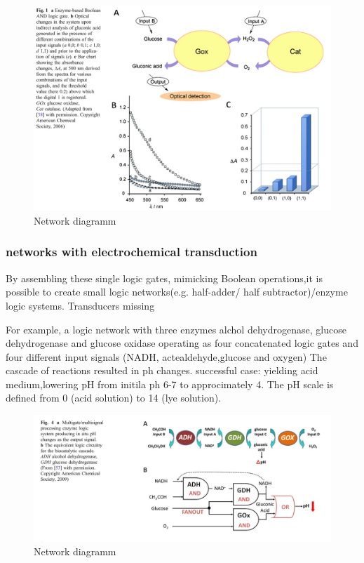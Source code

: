 \documentclass[runningheads]{llncs}
\begin{document}
	\begin{figure} \centering \includegraphics[scale= 0.3]{AND.png} \caption{Network diagramm} \label{img:and} \end{figure}
	
	\subsubsection{networks with electrochemical transduction}
	By assembling these single logic gates, mimicking Boolean operations,it is possible to create small logic networks(e.g. half-adder/ half subtractor)/enzyme logic systems. Transducers missing 
	
	For example, a logic network with three enzymes alchol dehydrogenase, glucose dehydrogenase and glucose oxidase operating as four concatenated logic gates and four different input signals (NADH,  actealdehyde,glucose and oxygen) The cascade of reactions resulted in ph changes. 
	successful case: yielding acid medium,lowering pH from initila ph 6-7 to approcimately 4. The pH scale is defined from 0 (acid solution) to 14 (lye solution).
	
	\begin{figure} \centering \includegraphics[scale= 0.3]{biocomputing_sensor.png} \caption{Network diagramm} \label{img:grafik-test} \end{figure}
	
\end{document}
